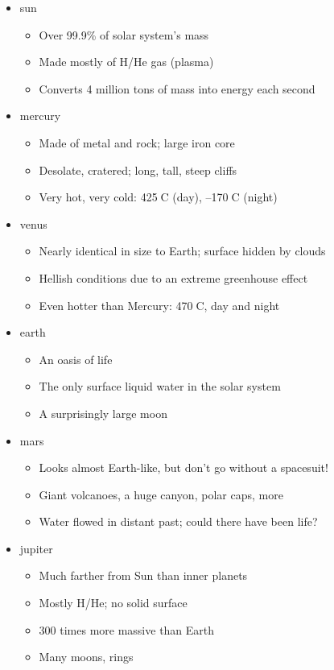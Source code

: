\documentclass[12pt]{article}
\begin{document}
\begin{itemize}
\item sun
\begin{itemize}
\item Over 99.9\% of solar system's mass
\item Made mostly of H/He gas (plasma)
\item Converts 4 million tons of mass into energy each second
\end{itemize}
\item mercury
\begin{itemize}
\item Made of metal and rock; large iron core
\item Desolate, cratered; long, tall, steep cliffs
\item Very hot, very cold: 425C (day), –170C (night)
\end{itemize}
\item venus
\begin{itemize}
\item Nearly identical in size to Earth; surface hidden by clouds
\item Hellish conditions due to an extreme greenhouse effect
\item Even hotter than Mercury: 470C, day and night
\end{itemize}
\item earth
\begin{itemize}
\item An oasis of life
\item The only surface liquid water in the solar system
\item A surprisingly large moon
\end{itemize}
\item mars
\begin{itemize}
\item Looks almost Earth-like, but don't go without a spacesuit!
\item Giant volcanoes, a huge canyon, polar caps, more
\item Water flowed in distant past; could there have been life?
\end{itemize}
\item jupiter
\begin{itemize}
\item Much farther from Sun than inner planets
\item Mostly H/He; no solid surface
\item 300 times more massive than Earth
\item Many moons, rings

\end{itemize}
\end{itemize}
\end{document}
